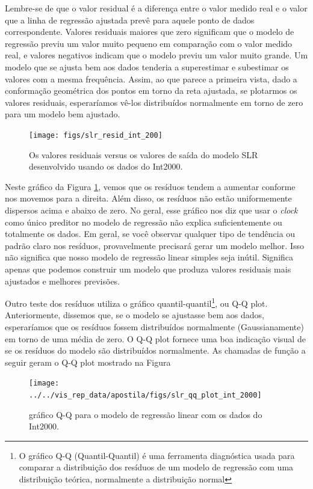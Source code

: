 \documentclass[article]{memoir}
\begin{document}
{Lembre-se de que o valor residual é a diferença entre o valor medido real e o valor que a linha de regressão ajustada prevê para aquele ponto de dados correspondente. Valores residuais maiores que zero significam que o modelo de regressão previu um valor muito pequeno em comparação com o valor medido real, e valores negativos indicam que o modelo previu um valor muito grande. Um modelo que se ajusta bem aos dados tenderia a superestimar e subestimar os valores com a mesma frequência. Assim, ao que parece a primeira vista, dado a conformação geométrica dos pontos em torno da reta ajustada, se plotarmos os valores residuais, esperaríamos vê-los distribuídos normalmente em torno de zero para um modelo bem ajustado.
\begin{figure}
	\centering
	\texttt{[image: figs/slr\_resid\_int\_200]}
	\caption{Os valores residuais versus os valores de saída do modelo  SLR desenvolvido usando os dados do Int2000.}
	\label{fig:slrresidint200}
\end{figure}

Neste gráfico da Figura \ref{fig:slrresidint200}, vemos que os resíduos tendem a aumentar conforme nos movemos para a direita. Além disso, os resíduos não estão uniformemente dispersos acima e abaixo de zero. No geral, esse gráfico nos diz que usar o \textit{clock} como único preditor no modelo de regressão não explica suficientemente ou totalmente os dados. Em geral, se você observar qualquer tipo de tendência ou padrão claro nos resíduos, provavelmente precisará gerar um modelo melhor. Isso não significa que nosso modelo de regressão linear simples seja inútil. Significa apenas que podemos construir um modelo que produza valores residuais mais ajustados e melhores previsões.

Outro teste dos resíduos utiliza o gráfico quantil-quantil\footnote{O gráfico Q-Q (Quantil-Quantil) é uma ferramenta diagnóstica usada para comparar a distribuição dos resíduos de um modelo de regressão com uma distribuição teórica, normalmente a distribuição normal}, ou Q-Q plot. Anteriormente, dissemos que, se o modelo se ajustasse bem aos dados, esperaríamos que os resíduos fossem distribuídos normalmente (Gaussianamente) em torno de uma média de zero. O Q-Q plot fornece uma boa indicação visual de se os resíduos do modelo são distribuídos normalmente. As chamadas de função a seguir geram o Q-Q plot mostrado na Figura 


\begin{figure}[ht]
	\centering
	\texttt{[image: ../../vis\_rep\_data/apostila/figs/slr\_qq\_plot\_int\_2000]}
	\caption{ gráfico Q-Q  para o modelo de regressão linear com os dados do Int2000.}
	\label{fig:slrqqplotint201}
\end{figure}

}
\end{document}
